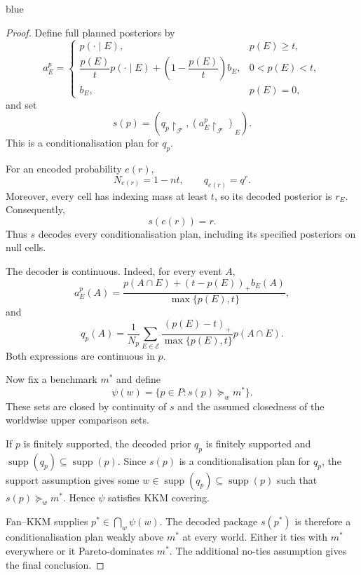\documentclass[11pt]{article}
\theoremstyle{definition}
\theoremstyle{remark}
\newcommand{\agenda}{\mathcal F}
\newcommand{\supp}{\operatorname{supp}}
\newenvironment{AIwritten}{\begin{color}{blue}}{\end{color}}
\begin{document}
\begin{AIwritten}
\begin{proof}
		Define full planned posteriors by
		\[
		a_E^p=
		\begin{cases}
			p(\cdot\mid E), & p(E)\ge t,\\[2mm]
			\dfrac{p(E)}{t}p(\cdot\mid E)
			+\left(1-\dfrac{p(E)}{t}\right)b_E,
			& 0<p(E)<t,\\[2mm]
			b_E, & p(E)=0,
		\end{cases}
		\]
		and set
		\[
		s(p)=
		\left(q_p\upharpoonright_\agenda,
		(a_E^p\upharpoonright_\agenda)_E\right).
		\]
		This is a conditionalisation plan for $q_p$.
		
		For an encoded probability $e(r)$,
		\[
		N_{e(r)}=1-nt,
		\qquad q_{e(r)}=q^r.
		\]
		Moreover, every cell has indexing mass at least
		$t$, so its decoded posterior is $r_E$.
		Consequently,
		\[
		s(e(r))=r.
		\]
		Thus $s$ decodes every conditionalisation plan,
		including its specified posteriors on null cells.
		
		The decoder is continuous. Indeed, for every
		event $A$,
		\[
		a_E^p(A)=
		\frac{p(A\cap E)+(t-p(E))_+b_E(A)}
		{\max\{p(E),t\}},
		\]
		and
		\[
		q_p(A)=
		\frac{1}{N_p}
		\sum_{E\in\mathcal E}
		\frac{(p(E)-t)_+}{\max\{p(E),t\}}
		p(A\cap E).
		\]
		Both expressions are continuous in $p$.
		
		Now fix a benchmark $m^*$ and define
		\[
		\psi(w)=\{p\in P:s(p)\succeq_w m^*\}.
		\]
		These sets are closed by continuity of $s$
		and the assumed closedness of the worldwise
		upper comparison sets.
		
		If $p$ is finitely supported, the decoded prior
		$q_p$ is finitely supported and
		$\supp(q_p)\subseteq\supp(p)$.
		Since $s(p)$ is a conditionalisation plan for $q_p$,
		the support assumption gives some
		$w\in\supp(q_p)\subseteq\supp(p)$ such that
		$s(p)\succeq_w m^*$.
		Hence $\psi$ satisfies KKM covering.
		
		Fan--KKM supplies $p^*\in\bigcap_w\psi(w)$.
		The decoded package $s(p^*)$ is therefore a
		conditionalisation plan weakly above $m^*$
		at every world. Either it ties with $m^*$
		everywhere or it Pareto-dominates $m^*$.
		The additional no-ties assumption gives the
		final conclusion.
	\end{proof}
\end{AIwritten}
\end{document}
